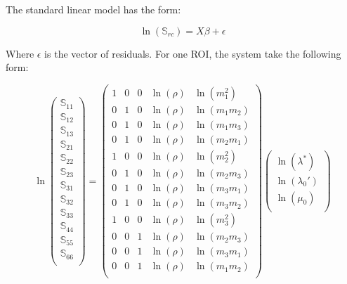 \documentclass[a4paper,fleqn]{DC_ArtStyle}
\begin{document}
The standard linear model has the form:

\begin{equation}
	\ln(\mathbb{S}_{rc}) = X \beta + \epsilon
\end{equation}

Where $\epsilon$ is the vector of residuals. For one ROI, the system take the following form:

\begin{equation}
	\ln
	\begin{pmatrix}
		\mathbb{S}_{11} \\
		\mathbb{S}_{12} \\
		\mathbb{S}_{13} \\
		\mathbb{S}_{21} \\
		\mathbb{S}_{22} \\
		\mathbb{S}_{23} \\
		\mathbb{S}_{31} \\
		\mathbb{S}_{32} \\
		\mathbb{S}_{33} \\
		\mathbb{S}_{44} \\
		\mathbb{S}_{55} \\
		\mathbb{S}_{66} \\
	\end{pmatrix} = \begin{pmatrix}
		1 & 0 & 0 & \ln(\rho) & \ln(m_1^2) \\
		0 & 1 & 0 & \ln(\rho) & \ln(m_1 m_2) \\
		0 & 1 & 0 & \ln(\rho) & \ln(m_1 m_3) \\
		0 & 1 & 0 & \ln(\rho) & \ln(m_2 m_1) \\
		1 & 0 & 0 & \ln(\rho) & \ln(m_2^2) \\
		0 & 1 & 0 & \ln(\rho) & \ln(m_2 m_3) \\
		0 & 1 & 0 & \ln(\rho) & \ln(m_3 m_1) \\
		0 & 1 & 0 & \ln(\rho) & \ln(m_3 m_2) \\
		1 & 0 & 0 & \ln(\rho) & \ln(m_3^2) \\
		0 & 0 & 1 & \ln(\rho) & \ln(m_2 m_3) \\
		0 & 0 & 1 & \ln(\rho) & \ln(m_3 m_1) \\
		0 & 0 & 1 & \ln(\rho) & \ln(m_1 m_2) \\
	\end{pmatrix} \begin{pmatrix}
		\ln(\lambda^{*}) \\
		\ln(\lambda_0') \\
		\ln(\mu_0) \\

\end{pmatrix}
\end{equation}
\end{document}
